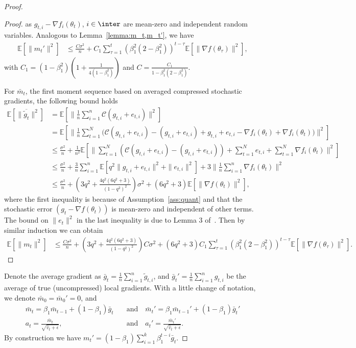 \documentclass[11pt]{article}
\begin{document}
\begin{proof}
\begin{proof}
as $g_{t,i}-\nabla f_i(\theta_t)$, $i \in \inter$ are mean-zero and independent random variables. Analogous to Lemma~\ref{lemma:m_t,m_t'}, we have
\begin{align}
    \mathbb E[\|m_t'\|^2]&\leq  \frac{C\sigma^2}{n}+C_1 \sum_{\tau=1}^t (\beta_1^2(2-\beta_1^2))^{t-\tau}\mathbb E[\|\nabla f(\theta_\tau)\|^2],
\end{align}
with $C_1=(1-\beta_1^2)(1+\frac{1}{4(1-\beta_1^2)})$ and $C=\frac{C_1}{1-\beta_1^2(2-\beta_1^2)}$.


For $\bar m_t$, the first moment sequence based on averaged compressed stochastic gradients, the following bound holds
\begin{align*}
    \mathbb E[\|\overline{\tilde g_t}\|^2]&=\mathbb E[\|\frac{1}{n}\sum_{i=1}^n \mathcal C(g_{t,i}+e_{t,i})\|^2]\\
    &=\mathbb E[\|\frac{1}{n}\sum_{t=1}^N \big(\mathcal C(g_{t,i}+e_{t,i})-(g_{t,i}+e_{t,i})+g_{t,i}+e_{t,i}-\nabla f_i(\theta_t)+\nabla f_i(\theta_t)\big)\|^2]\\
    &\leq \frac{\sigma^2}{n}+\frac{1}{n^2}\mathbb E[\|\sum_{t=1}^N (\mathcal C(g_{t,i}+e_{t,i})-(g_{t,i}+e_{t,i}))+\sum_{t=1}^N e_{t,i}+\sum_{t=1}^N \nabla f_i(\theta_t)\|^2]\\
    &\leq \frac{\sigma^2}{n}+\frac{3}{n}\sum_{i=1}^n\mathbb E[q^2\|g_{t,i}+e_{t,i}\|^2+\|e_{t,i}\|^2]+3\|\frac{1}{n}\sum_{i=1}^n\nabla f_i(\theta_t)\|^2\\
    &\leq \frac{\sigma^2}{n}+(3q^2+\frac{4q^2(6q^2+3)}{(1-q^2)^2})\sigma^2+(6q^2+3)\mathbb E[\|\nabla f(\theta_t)\|^2],
\end{align*}
where the first inequality is because of Assumption~\ref{ass:quant} and that the stochastic error $(g_t-\nabla f(\theta_t))$ is mean-zero and independent of other terms. The bound on $\|e_t\|^2$ in the last inequality is due to Lemma 3 of~\cite{karimireddy2019error}. Then by similar induction we can obtain
\begin{align*}
    \mathbb E[\|m_t\|^2]&\leq \frac{C\sigma^2}{n}+(3q^2+\frac{4q^2(6q^2+3)}{(1-q^2)^2})C\sigma^2+(6q^2+3)C_1\sum_{\tau=1}^t (\beta_1^2(2-\beta_1^2))^{t-\tau}\mathbb E[\|\nabla f(\theta_\tau)\|^2].
\end{align*}
\end{proof}


Denote the average gradient as $\bar g_t=\frac{1}{n}\sum_{i=1}^n \tilde g_{t,i}$, and $\bar g_t'=\frac{1}{n}\sum_{i=1}^n g_{t,i}$ be the average of true (uncompressed) local gradients. With a little change of notation, we denote $\bar m_0=\bar m_0'=0$, and
\begin{align*}
\bar m_t=\beta_1 \bar m_{t-1}+(1-\beta_1)\bar g_t \quad & \textrm{and} \quad \bar m_t'=\beta_1 \bar m_{t-1}'+(1-\beta_1) \bar g_t'\\
    a_t=\frac{\bar m_t}{\sqrt{\hat v_t+\epsilon}},\quad & \textrm{and} \quad  a_t'=\frac{\bar m_t'}{\sqrt{\hat v_t+\epsilon}}.
\end{align*}
By construction we have $m_t'=(1-\beta_1)\sum_{i=1}^k\beta_1^{t-i} \bar g_t$. 


\end{proof}
\end{document}
